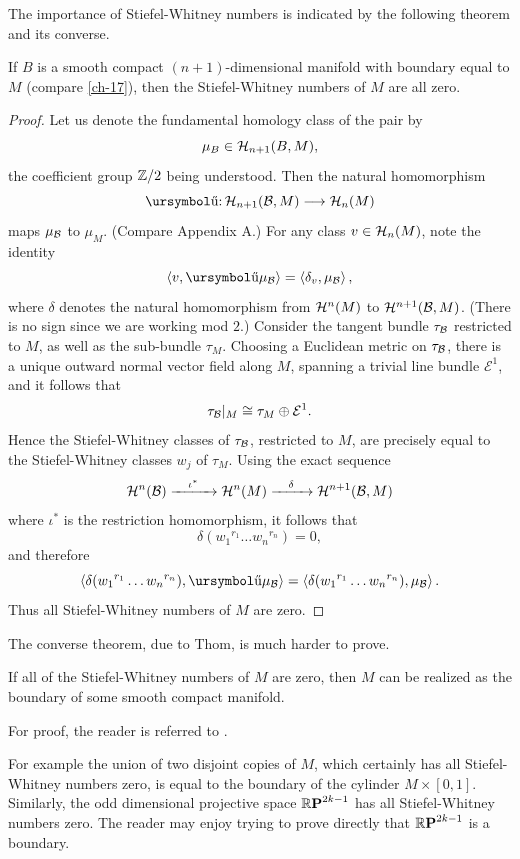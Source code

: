 The importance of Stiefel-Whitney numbers is indicated by the following theorem and its converse.
\begin{theorem}[Pontrjagin]\label{thm-4-9}
If $B$ is a smooth compact $(n+1)$-dimensional manifold with boundary equal to $M$ (compare \cref{ch-17}),
		then the Stiefel-Whitney numbers of $M$ are all zero.
\end{theorem}
\begin{proof}
	Let us denote the fundamental homology class of the pair by
	\[\mu_B\in\mathcal{H}_{n+1}(B,M),\]
	the coefficient group $\mathbb{Z}/2$ being understood. Then the natural homomorphism
	\[\map{\partial}{\homology_{n+1}(\B ,M)}{\homology_{n}(M)}\]
	maps $\mu_{\mathcal{B}} $ to $ \mu_M $. (Compare Appendix A.) For any class $v\in \mathcal{H}_{n}(M)$,
	note the identity
	\[\ip{v,\partial\mu_\B }=\ip{\delta_{v},\mu_\B },\]
	where $\delta$ denotes the natural homomorphism from $\mathcal{H}^{n}(M)$ to $\mathcal{H}^{n+1}(\mathcal{B} ,M)$.
	(There is no sign since we are working mod $2$.) Consider the tangent
	bundle $\tau_{\mathcal{B}} $ restricted to $M$, as well as the sub-bundle $\tau_M$. Choosing a
	Euclidean metric on $\tau_{\mathcal{B}} $, there is a unique outward normal vector field
	along $M$, spanning a trivial line bundle $\mathcal{E}^1$, and it follows that
	\[\tau_{\mathcal{B}} |_M\cong\tau_M\oplus\mathcal{E}^1.\]
	Hence the Stiefel-Whitney classes of $\tau_{\mathcal{B}} $, restricted to $M$, are precisely
	equal to the Stiefel-Whitney classes $w_j$ of $\tau_M$. Using the exact sequence
	\[\mathcal{H}^n(\mathcal{B} )\xrightarrow{\quad \iota^*\quad}\mathcal{H}^n(M)\xrightarrow{\quad \delta\quad} \mathcal{H}^{n+1}(\mathcal{B} ,M)\]
	where $ \iota^* $ is the restriction homomorphism, it follows that
	\[\delta({w}_{1}{ }^{r_{1}} \dots w_{n}{ }^{r_n})=0,\]
	and therefore
	\[\ip{\delta({w}_{1}{ }^{r_{1}} \dots w_{n}{ }^{r_n}),\partial\mu_\B }=\ip{\delta({w}_{1}{ }^{r_{1}} \dots w_{n}{ }^{r_n}),\mu_\B }.\]
	Thus all Stiefel-Whitney numbers of $M$ are zero.
\end{proof}
The converse theorem, due to Thom, is much harder to prove.
\begin{theorem}[Thom]\label{thm-4-10}
	If all of the Stiefel-Whitney numbers
	of $M$ are zero, then $M$ can be realized as the boundary of some
	smooth compact manifold.
	
\end{theorem}

For proof, the reader is referred to \cite{65}.

For example the union of two disjoint copies of $M$, which certainly
has all Stiefel-Whitney numbers zero, is equal to the boundary of the
cylinder $M\times [0, 1]$. Similarly, the odd dimensional projective space
$\boldsymbol{\mathbb{R}}\boldsymbol{\mathrm{P}}^{2k-1}$ has all Stiefel-Whitney numbers zero. The reader may enjoy trying
to prove directly that $\boldsymbol{\mathbb{R}}\boldsymbol{\mathrm{P}}^{2k-1}$ is a boundary.

